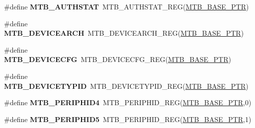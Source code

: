 \begin{DoxyCompactItemize}
\item 
\hypertarget{group___m_t_b___register___accessor___macros_gaf3db7626003fd4b420efaf3c34278d76}{}\#define {\bfseries M\+T\+B\+\_\+\+A\+U\+T\+H\+S\+T\+A\+T}~M\+T\+B\+\_\+\+A\+U\+T\+H\+S\+T\+A\+T\+\_\+\+R\+E\+G(\hyperlink{group___m_t_b___peripheral_gadf7f362dfa67354951e6a23ddf08cd73}{M\+T\+B\+\_\+\+B\+A\+S\+E\+\_\+\+P\+T\+R})\label{group___m_t_b___register___accessor___macros_gaf3db7626003fd4b420efaf3c34278d76}

\item 
\hypertarget{group___m_t_b___register___accessor___macros_ga1335969fc1d5c066fb8d087c6851fb5e}{}\#define {\bfseries M\+T\+B\+\_\+\+D\+E\+V\+I\+C\+E\+A\+R\+C\+H}~M\+T\+B\+\_\+\+D\+E\+V\+I\+C\+E\+A\+R\+C\+H\+\_\+\+R\+E\+G(\hyperlink{group___m_t_b___peripheral_gadf7f362dfa67354951e6a23ddf08cd73}{M\+T\+B\+\_\+\+B\+A\+S\+E\+\_\+\+P\+T\+R})\label{group___m_t_b___register___accessor___macros_ga1335969fc1d5c066fb8d087c6851fb5e}

\item 
\hypertarget{group___m_t_b___register___accessor___macros_ga2612f1a6a7623fbe2e55b49a028e227e}{}\#define {\bfseries M\+T\+B\+\_\+\+D\+E\+V\+I\+C\+E\+C\+F\+G}~M\+T\+B\+\_\+\+D\+E\+V\+I\+C\+E\+C\+F\+G\+\_\+\+R\+E\+G(\hyperlink{group___m_t_b___peripheral_gadf7f362dfa67354951e6a23ddf08cd73}{M\+T\+B\+\_\+\+B\+A\+S\+E\+\_\+\+P\+T\+R})\label{group___m_t_b___register___accessor___macros_ga2612f1a6a7623fbe2e55b49a028e227e}

\item 
\hypertarget{group___m_t_b___register___accessor___macros_gae7594a40064338c8e22f729511a20475}{}\#define {\bfseries M\+T\+B\+\_\+\+D\+E\+V\+I\+C\+E\+T\+Y\+P\+I\+D}~M\+T\+B\+\_\+\+D\+E\+V\+I\+C\+E\+T\+Y\+P\+I\+D\+\_\+\+R\+E\+G(\hyperlink{group___m_t_b___peripheral_gadf7f362dfa67354951e6a23ddf08cd73}{M\+T\+B\+\_\+\+B\+A\+S\+E\+\_\+\+P\+T\+R})\label{group___m_t_b___register___accessor___macros_gae7594a40064338c8e22f729511a20475}

\item 
\hypertarget{group___m_t_b___register___accessor___macros_ga9332069b62de88f23a50e30da92309ef}{}\#define {\bfseries M\+T\+B\+\_\+\+P\+E\+R\+I\+P\+H\+I\+D4}~M\+T\+B\+\_\+\+P\+E\+R\+I\+P\+H\+I\+D\+\_\+\+R\+E\+G(\hyperlink{group___m_t_b___peripheral_gadf7f362dfa67354951e6a23ddf08cd73}{M\+T\+B\+\_\+\+B\+A\+S\+E\+\_\+\+P\+T\+R},0)\label{group___m_t_b___register___accessor___macros_ga9332069b62de88f23a50e30da92309ef}

\item 
\hypertarget{group___m_t_b___register___accessor___macros_gace0a08cd68372a002199a1e22336e027}{}\#define {\bfseries M\+T\+B\+\_\+\+P\+E\+R\+I\+P\+H\+I\+D5}~M\+T\+B\+\_\+\+P\+E\+R\+I\+P\+H\+I\+D\+\_\+\+R\+E\+G(\hyperlink{group___m_t_b___peripheral_gadf7f362dfa67354951e6a23ddf08cd73}{M\+T\+B\+\_\+\+B\+A\+S\+E\+\_\+\+P\+T\+R},1)\label{group___m_t_b___register___accessor___macros_gace0a08cd68372a002199a1e22336e027}


\end{DoxyCompactItemize}
